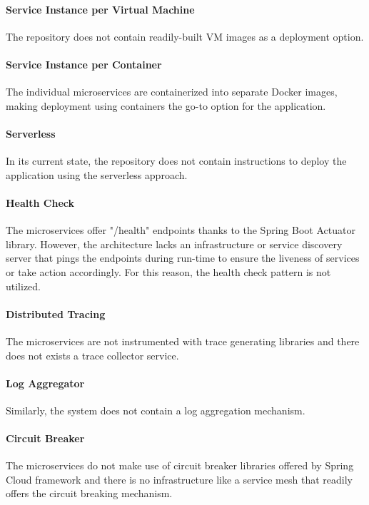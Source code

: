 \documentclass{Configuration_Files/PoliMi3i_thesis}
\begin{document}
\paragraph{Service Instance per Virtual Machine} The repository does not contain readily-built VM images as a deployment option.

\paragraph{Service Instance per Container} The individual microservices are containerized into separate Docker images, making deployment using containers the go-to option for the application.

\paragraph{Serverless} In its current state, the repository does not contain instructions to deploy the application using the serverless approach.

\paragraph{Health Check} The microservices offer "/health" endpoints thanks to the Spring Boot Actuator\footnotemark[85] library.
However, the architecture lacks an infrastructure or service discovery server that pings the endpoints during run-time to ensure the liveness of services or take action accordingly.
For this reason, the health check pattern is not utilized.

\paragraph{Distributed Tracing} The microservices are not instrumented with trace generating libraries and there does not exists a trace collector service.

\paragraph{Log Aggregator} Similarly, the system does not contain a log aggregation mechanism.

\paragraph{Circuit Breaker} The microservices do not make use of circuit breaker libraries offered by Spring Cloud framework and there is no infrastructure like a service mesh that readily offers the circuit breaking mechanism.
\end{document}
